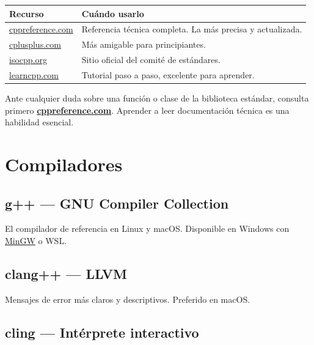 \documentclass[12pt, oneside]{article}
\begin{document}
\begin{center}
\begin{tabular}{lp{9cm}}
  \toprule
  \textbf{Recurso} & \textbf{Cuándo usarlo} \\
  \midrule
  \href{https://en.cppreference.com}{cppreference.com}
    & Referencia técnica completa. La más precisa y actualizada. \\
  \href{https://cplusplus.com/reference}{cplusplus.com}
    & Más amigable para principiantes. \\
  \href{https://isocpp.org}{isocpp.org}
    & Sitio oficial del comité de estándares. \\
  \href{https://www.learncpp.com}{learncpp.com}
    & Tutorial paso a paso, excelente para aprender. \\
  \bottomrule
\end{tabular}
\end{center}

\begin{consejo}
  Ante cualquier duda sobre una función o clase de la biblioteca estándar,
  consulta primero \href{https://en.cppreference.com}{\textbf{cppreference.com}}.
  Aprender a leer documentación técnica es una habilidad esencial.
\end{consejo}

\section{Compiladores}

\subsection{g++ — GNU Compiler Collection}

El compilador de referencia en Linux y macOS.
Disponible en Windows con \href{https://www.mingw-w64.org/}{MinGW} o WSL.

\subsection{clang++ — LLVM}

Mensajes de error más claros y descriptivos. Preferido en macOS.

\subsection{cling — Intérprete interactivo}
\end{document}
